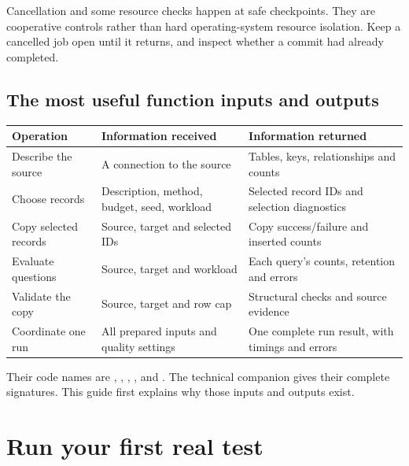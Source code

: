 \documentclass[12pt,a4paper,oneside]{report}
\begin{document}
Cancellation and some resource checks happen at safe checkpoints. They are cooperative controls rather than hard operating-system resource isolation. Keep a cancelled job open until it returns, and inspect whether a commit had already completed.

\section{The most useful function inputs and outputs}
\begin{longtable}{>{\RaggedRight\arraybackslash}p{.28\linewidth}>{\RaggedRight\arraybackslash}p{.30\linewidth}>{\RaggedRight\arraybackslash}p{.30\linewidth}}
\toprule\textbf{Operation} & \textbf{Information received} & \textbf{Information returned}\\\midrule\endhead
Describe the source & A connection to the source & Tables, keys, relationships and counts\\[4pt]
Choose records & Description, method, budget, seed, workload & Selected record IDs and selection diagnostics\\[4pt]
Copy selected records & Source, target and selected IDs & Copy success/failure and inserted counts\\[4pt]
Evaluate questions & Source, target and workload & Each query's counts, retention and errors\\[4pt]
Validate the copy & Source, target and row cap & Structural checks and source evidence\\[4pt]
Coordinate one run & All prepared inputs and quality settings & One complete run result, with timings and errors\\\bottomrule
\end{longtable}
Their code names are , , , ,  and . The technical companion gives their complete signatures. This guide first explains why those inputs and outputs exist.

\chapter{Run your first real test}
\end{document}
